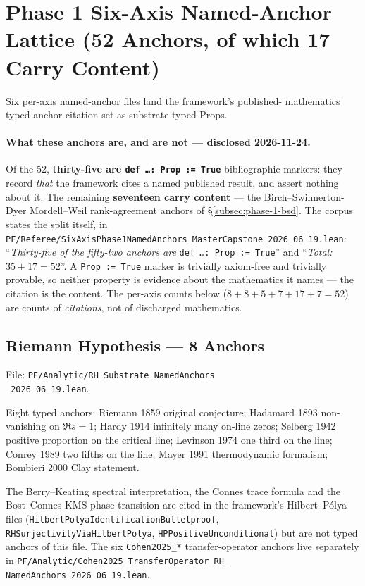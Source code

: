 \section{Phase 1 Six-Axis Named-Anchor Lattice (52 Anchors, of which
17 Carry Content)}
\label{sec:phase-1-six-axis-named-anchors}

Six per-axis named-anchor files land the framework's published-
mathematics typed-anchor citation set as substrate-typed Props.

\paragraph{What these anchors are, and are not --- disclosed 2026-11-24.}
Of the 52, \textbf{thirty-five are \texttt{def \ldots : Prop := True}}
bibliographic markers: they record \emph{that} the framework cites a
named published result, and assert nothing about it. The remaining
\textbf{seventeen carry content} --- the Birch--Swinnerton-Dyer
Mordell--Weil rank-agreement anchors of \S\ref{subsec:phase-1-bsd}.
The corpus states the split itself, in
\texttt{PF/Referee/SixAxisPhase1NamedAnchors\_MasterCapstone\_2026\_06\_19.lean}:
``\emph{Thirty-five of the fifty-two anchors are} \texttt{def \ldots :
Prop := True}'' and ``\emph{Total:} $35 + 17 = 52$''. A
\texttt{Prop := True} marker is trivially axiom-free and trivially
provable, so neither property is evidence about the mathematics it
names --- the citation is the content. The per-axis counts below
($8 + 8 + 5 + 7 + 17 + 7 = 52$) are counts of \emph{citations}, not of
discharged mathematics.

\subsection{Riemann Hypothesis --- 8 Anchors}
\label{subsec:phase-1-rh}

File: \texttt{PF/Analytic/RH\_Substrate\_NamedAnchors\\
\_2026\_06\_19.lean}.

Eight typed anchors: Riemann 1859 original conjecture; Hadamard
1893 non-vanishing on $\Re s = 1$; Hardy 1914 infinitely many
on-line zeros; Selberg 1942 positive proportion on the critical
line; Levinson 1974 one third on the line; Conrey 1989 two fifths
on the line; Mayer 1991 thermodynamic formalism; Bombieri 2000
Clay statement.

The Berry--Keating spectral interpretation, the Connes trace
formula and the Bost--Connes KMS phase transition are cited in the
framework's Hilbert--P\'olya files
(\texttt{HilbertPolyaIdentificationBulletproof},
\texttt{RHSurjectivityViaHilbertPolya},
\texttt{HPPositiveUnconditional}) but are not typed anchors of this
file. The six \texttt{Cohen2025\_*} transfer-operator anchors live
separately in
\texttt{PF/Analytic/Cohen2025\_TransferOperator\_RH\_\\
NamedAnchors\_2026\_06\_19.lean}.

